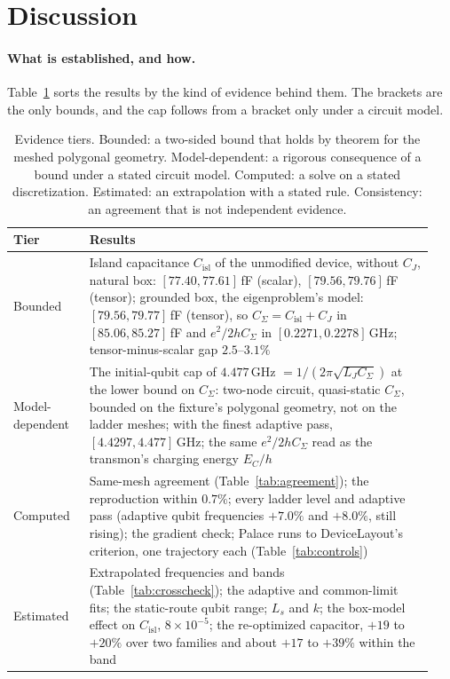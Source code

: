 \documentclass{anvil-paper}
\newcommand{\Cisl}{C_{\mathrm{isl}}}
\begin{document}
\section{Discussion}
\label{sec:discussion}

\paragraph{What is established, and how.}
Table~\ref{tab:tiers} sorts the results by the kind of evidence behind
them. The brackets are the only bounds, and the cap follows from a bracket
only under a circuit model.

\begin{table}[htbp]
  \centering
  \caption{Evidence tiers. Bounded: a two-sided bound that holds by theorem
  for the meshed polygonal geometry. Model-dependent: a rigorous consequence of a
  bound under a stated circuit model. Computed: a solve on a stated
  discretization. Estimated: an extrapolation with a stated rule.
  Consistency: an agreement that is not independent evidence.}
  \label{tab:tiers}
  \footnotesize
  \begin{tabular}{@{}>{\raggedright\arraybackslash}p{0.17\linewidth}>{\raggedright\arraybackslash}p{0.77\linewidth}@{}}
    \toprule
    Tier & Results \\
    \midrule
    Bounded & Island capacitance $\Cisl$ of the unmodified device, without $C_J$, natural box: $[77.40, 77.61]$\,fF (scalar), $[79.56, 79.76]$\,fF (tensor); grounded box, the eigenproblem's model: $[79.56, 79.77]$\,fF (tensor), so $C_\Sigma = \Cisl + C_J$ in $[85.06, 85.27]$\,fF and $e^2/2hC_\Sigma$ in $[0.2271, 0.2278]$\,GHz; tensor-minus-scalar gap $2.5$--$3.1\%$ \\
    Model-dependent & The initial-qubit cap of $4.477$\,GHz $= 1/(2\pi\sqrt{L_J C_\Sigma})$ at the lower bound on $C_\Sigma$: two-node circuit, quasi-static $C_\Sigma$, bounded on the fixture's polygonal geometry, not on the ladder meshes; with the finest adaptive pass, $[4.4297, 4.477]$\,GHz; the same $e^2/2hC_\Sigma$ read as the transmon's charging energy $E_C/h$ \\
    Computed & Same-mesh agreement (Table~\ref{tab:agreement}); the reproduction within $0.7\%$; every ladder level and adaptive pass (adaptive qubit frequencies $+7.0\%$ and $+8.0\%$, still rising); the gradient check; Palace runs to DeviceLayout's criterion, one trajectory each (Table~\ref{tab:controls}) \\
    Estimated & Extrapolated frequencies and bands (Table~\ref{tab:crosscheck}); the adaptive and common-limit fits; the static-route qubit range; $L_s$ and $k$; the box-model effect on $\Cisl$, $8\times10^{-5}$; the re-optimized capacitor, $+19$ to $+20\%$ over two families and about $+17$ to $+39\%$ within the band \\

\end{tabular}
\end{table}
\end{document}
